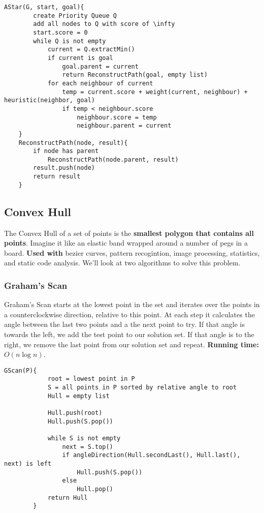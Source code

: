 \documentclass{article}
\begin{document}
	\begin{lstlisting}[style=pseudo]
	AStar(G, start, goal){
		create Priority Queue Q
		add all nodes to Q with score of \infty
		start.score = 0
		while Q is not empty
			current = Q.extractMin()
			if current is goal
				goal.parent = current
				return ReconstructPath(goal, empty list)
			for each neighbour of current
				temp = current.score + weight(current, neighbour) + heuristic(neighbor, goal)
				if temp < neighbour.score
					neighbour.score = temp
					neighbour.parent = current
	}
	ReconstructPath(node, result){
		if node has parent
			ReconstructPath(node.parent, result)
		result.push(node)
		return result
	}
	\end{lstlisting}




	\clearpage
	\subsection{Convex Hull}
	The Convex Hull of a set of points is the {\bf smallest polygon that contains all points}. Imagine it like an elastic band wrapped around a number of pegs in a board. {\bf Used with} bezier curves, pattern recogintion, image processing, statistics, and static code analysis. We'll look at two algorithms to solve this problem.

		\subsubsection{Graham's Scan}
		Graham's Scan starts at the lowest point in the set and iterates over the points in a counterclockwise direction, relative to this point. At each step it calculates the angle between the last two points and a the next point to try. If that angle is towards the left, we add the test point to our solution set. If that angle is to the right, we remove the last point from our solution set and repeat. {\bf Running time:} $O(n \log n)$.

		\begin{lstlisting}[style=pseudo]
		GScan(P){
			root = lowest point in P
			S = all points in P sorted by relative angle to root
			Hull = empty list

			Hull.push(root)
			Hull.push(S.pop())

			while S is not empty
				next = S.top()
				if angleDirection(Hull.secondLast(), Hull.last(), next) is left
					Hull.push(S.pop())
				else
					Hull.pop()
			return Hull
		}
		\end{lstlisting}
\end{document}
